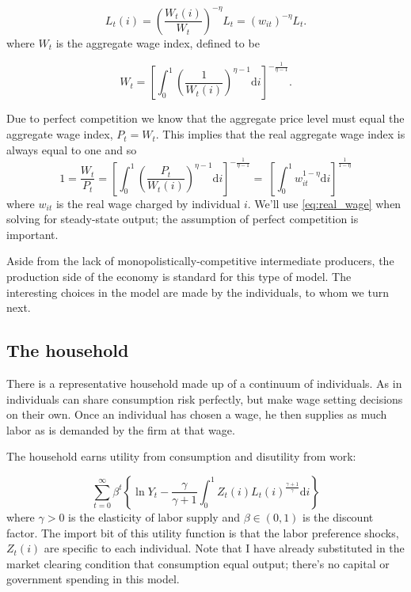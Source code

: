 \documentclass[12pt,a4paper]{scrartcl}            %
\begin{document}
\begin{equation}
    \label{eq:labor_demand}
    L_t(i) = \left( \frac{W_t(i)}{W_t} \right)^{-\eta}L_t = (w_{it})^{-\eta}L_t.
\end{equation}
%
where $W_t$ is the aggregate wage index, defined to be

\begin{equation} \label{eq:wage_index}
    W_t = \left[\int_{0}^{1}\left(\frac{1}{W_t(i)}\right)^{\eta - 1} \mathrm{d}i \right]^{-\frac{1}{\eta - 1}}.
\end{equation}

Due to perfect competition we know that the aggregate price level must equal the aggregate wage index, $P_t = W_t$.  This implies that the real aggregate wage index is always equal to one and so
%
\begin{equation} \label{eq:real_wage}
    1 = \frac{W_t}{P_t} = \left[\int_{0}^{1} \left( \frac{P_t}{W_t(i)} \right)^{\eta - 1} \mathrm{d}i \right]^{-\frac{1}{\eta - 1} }\!\!\!\! = \ \left[\int_{0}^{1} \! w_{it}^{1 - \eta} \mathrm{d}i \right]^{ \frac{1}{1 - \eta} }
\end{equation}
%
where $w_{it}$ is the real wage charged by individual $i$.
We'll use \eqref{eq:real_wage} when solving for steady-state output;  the assumption of perfect competition is important.

Aside from the lack of monopolistically-competitive intermediate producers, the production side of the economy is standard for this type of model.
The interesting choices in the model are made by the individuals, to whom we turn next.

\subsection{The household}
\label{sub:The household}

There is a representative household made up of a continuum of individuals.
As in \cite{erceg_henderson_levin_1999} individuals can share consumption risk perfectly, but make wage setting decisions on their own.
Once an individual has chosen a wage, he then supplies as much labor as is demanded by the firm at that wage.

The household earns utility from consumption and disutility from work:

\begin{equation} \label{eq:utility}
    \sum_{t=0}^{\infty} \beta^t \left\{\ln Y_t - \frac{\gamma}{\gamma + 1} \int_{0}^{1} Z_t(i)L_t(i)^{\frac{\gamma + 1}{\gamma}}\mathrm{d}i\right\}
\end{equation}
%
where $\gamma > 0$ is the elasticity of labor supply and $\beta \in (0, 1)$ is the discount factor.
The import bit of this utility function is that the labor preference shocks, $Z_t(i)$ are specific to each individual.
Note that I have already substituted in the market clearing condition that consumption equal output;
there's no capital or government spending in this model.
\end{document}
